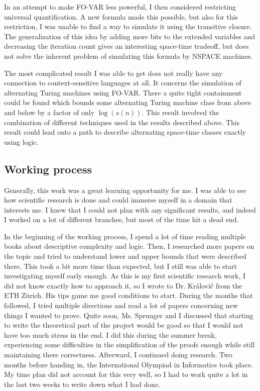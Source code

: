 In an attempt to make FO-VAR less powerful, I then considered restricting universal quantification.
A new formula made this possible, but also for this restriction, I was unable to find a way to simulate it using the transitive closure.
The generalization of this idea by adding more bits to the extended variables and decreasing the iteration count gives an interesting space-time tradeoff, but does not solve the inherent problem of simulating this formula by NSPACE machines.

The most complicated result I was able to get does not really have any connection to context-sensitive languages at all.
It concerns the simulation of alternating Turing machines using FO-VAR\@.
There a quite tight containment could be found which bounds some alternating Turing machine class from above and below by a factor of only $\log(s(n))$.
This result involved the combination of different techniques used in the results described above.
This result could lead onto a path to describe alternating space-time classes exactly using logic.

\subsection{Working process}\label{subsec:working-process}
Generally, this work was a great learning opportunity for me.
I was able to see how scientific research is done and could immerse myself in a domain that interests me.
I knew that I could not plan with any significant results, and indeed I worked on a lot of different branches, but most of the time hit a dead end.

In the beginning of the working process, I spend a lot of time reading multiple books about descriptive complexity and logic.
Then, I researched more papers on the topic and tried to understand lower and upper bounds that were described there.
This took a bit more time than expected, but I still was able to start investigating myself early enough.
As this is my first scientific research work, I did not know exactly how to approach it, so I wrote to Dr. Královič from the ETH Zürich.
His tips game me good conditions to start.
During the months that followed, I tried multiple directions and read a lot of papers concerning new things I wanted to prove.
Quite soon, Ms. Sprunger and I discussed that starting to write the theoretical part of the project would be good so that I would not have too much stress in the end.
I did this during the summer break, experiencing some difficulties in the simplification of the proofs enough while still maintaining there correctness.
Afterward, I continued doing research.
Two months before handing in, the International Olympiad in Informatics took place.
My time plan did not account for this very well, so I had to work quite a lot in the last two weeks to write down what I had done.

